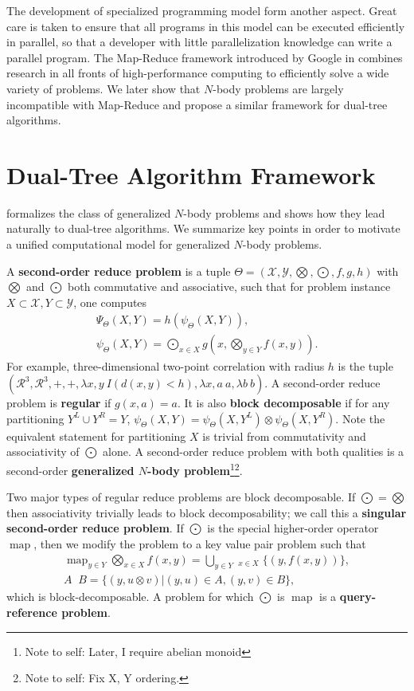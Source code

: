 \documentclass[times, leqno,twocolumn]{article}
\newcommand{\authornote}[1]{\footnote{Note to self: #1}}
\newcommand{\authorsnote}[1]{\authornote{#1}}
\newcommand{\union}{\cup}
\newcommand{\Union}{\bigcup}
\newcommand{\bigvec}[1]{\mathop{\overrightarrow{#1}}}
\DeclareMathOperator*{\map}{map}
\newcommand{\Gnp}{\Psi_{\Theta}}
\newcommand{\gnp}{\psi_{\Theta}}
\newcommand{\defterm}[1]{{\bf #1}}
\newcommand{\kdleft}[1]{#1^{\!L}}
\newcommand{\kdright}[1]{#1^{\!R}}
\newcommand{\dist}[2]{d(#1,#2)}
\begin{document}
The development of specialized programming model form another aspect.
Great care is taken to ensure that all programs in this model can be executed efficiently in parallel, so that a developer with little parallelization knowledge can write a parallel program.
The Map-Reduce framework introduced by Google in \cite{mapreduce} combines research in all fronts of high-performance computing to efficiently solve a wide variety of problems.
We later show that $N$-body problems are largely incompatible with Map-Reduce and propose a similar framework for dual-tree algorithms.

\section{Dual-Tree Algorithm Framework}

\cite{ryan_nips} formalizes the class of generalized $N$-body problems and shows how they lead naturally to dual-tree algorithms.
We summarize key points in order to motivate a unified computational model for generalized $N$-body problems.

A \defterm{second-order reduce problem} is a tuple $\Theta = (\mathcal{X}, \mathcal{Y}, \bigotimes, \bigodot, f, g, h)$ with $\bigotimes$ and $\bigodot$ both commutative and associative, such that for problem instance $X \subset {\mathcal{X}}, Y \subset {\mathcal{Y}}$, one computes
\[\begin{array}{l}
  \displaystyle \Gnp(X, Y) = h(\gnp(X, Y)),
  \\
  \displaystyle \gnp(X, Y) = \bigodot_{x \in X} g\!\left(x, \bigotimes_{y \in Y} f(x, y) \right).
\end{array}\]
\noindent For example, three-dimensional two-point correlation with radius $h$ is the tuple $(\mathcal{R}^3, \mathcal{R}^3, +, +, \lambda x,y ~ I(\dist{x}{y} < h), \lambda x,a ~ a, \lambda b ~ b)$.
A second-order reduce problem is \defterm{regular} if $g(x, a) = a$.
It is also \defterm{block decomposable} if for any partitioning $\kdleft{Y} \union \kdright{Y} = Y$, $\gnp(X,Y) = \gnp(X,\kdleft{Y}) \otimes \gnp(X,\kdright{Y})$.
Note the equivalent statement for partitioning $X$ is trivial from commutativity and associativity of $\bigodot$ alone.
A second-order reduce problem with both qualities is a second-order \defterm{generalized $N$-body problem}\authorsnote{Later, I require abelian monoid}\authorsnote{Fix X, Y ordering.}.

Two major types of regular reduce problems are block decomposable.
If $\bigodot = \bigotimes$ then associativity trivially leads to block decomposability; we call this a \defterm{singular second-order reduce problem}.
If $\bigodot$ is the special higher-order operator $\map$, then we modify the problem to a key value pair problem such that
\[\begin{array}{c}
  \displaystyle \map_{y \in Y} \bigotimes_{x \in X} f(x, y) = \Union_{y \in Y} \bigvec{\bigotimes}_{x \in X} \{(y, f(x, y))\},
  \\
  A \bigvec{\otimes} B = \{(y, u \otimes v) | (y,u) \in A, (y,v) \in B\},
\end{array}\]
\noindent which is block-decomposable.
A problem for which $\bigodot$ is $\map$ is a \defterm{query-reference problem}.
\end{document}

